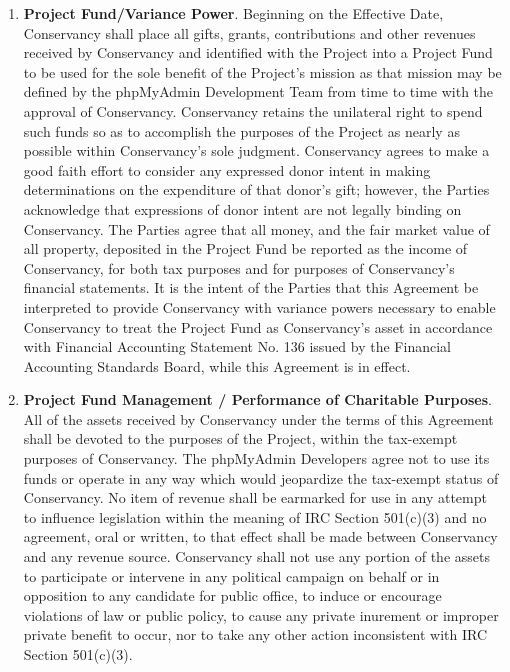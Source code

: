 \documentclass[letterpaper,12pt]{article}
\newcommand{\signatories}{phpMyAdmin Developers\xspace}
\newcommand{\leadershipbody}{phpMyAdmin Development Team\xspace}
\begin{document}
\begin{enumerate}[label=\arabic*.,ref=\S~\arabic*]
Notwithstanding the above, the \signatories agree that should Conservancy
be required to pay any taxes (including but not limited to sales taxes
and unrelated business taxable income) as the result of any activity
of the Project and/or activities undertaken by Conservancy on the
Project's behalf, such taxes shall be deducted from the Project Fund.


Conservancy will monitor any unrelated business taxable income and
may require the Project to cease activities generating such income
if the overall amounts exceed amounts permissible or prudent for Conservancy,
given Conservancy's tax exempt status.

\item \textbf{Project Fund/Variance Power}. Beginning on the Effective Date,
Conservancy shall place all gifts, grants, contributions and other
revenues received by Conservancy and identified with the Project into
a Project Fund to be used for the sole benefit of the Project's mission
as that mission may be defined by the \leadershipbody from
time to time with the approval of Conservancy. Conservancy retains
the unilateral right to spend such funds so as to accomplish the purposes
of the Project as nearly as possible within Conservancy's sole judgment.
Conservancy agrees to make a good faith effort to consider any expressed
donor intent in making determinations on the expenditure of that donor's
gift; however, the Parties acknowledge that expressions of donor intent
are not legally binding on Conservancy. The Parties agree that all
money, and the fair market value of all property, deposited in the
Project Fund be reported as the income of Conservancy, for both tax
purposes and for purposes of Conservancy's financial statements. It
is the intent of the Parties that this Agreement be interpreted to
provide Conservancy with variance powers necessary to enable Conservancy
to treat the Project Fund as Conservancy's asset in accordance with
Financial Accounting Statement No. 136 issued by the Financial Accounting
Standards Board, while this Agreement is in effect. 
\item \textbf{Project Fund Management / Performance of Charitable Purposes}.
\label{CharitablePurpose} All of the assets received by Conservancy
under the terms of this Agreement shall be devoted to the purposes
of the Project, within the tax-exempt purposes of Conservancy. The
\signatories agree not to use its funds or operate in any way which would
jeopardize the tax-exempt status of Conservancy. No item of revenue
shall be earmarked for use in any attempt to influence legislation
within the meaning of IRC Section 501(c)(3) and no agreement, oral
or written, to that effect shall be made between Conservancy and any
revenue source. Conservancy shall not use any portion of the assets
to participate or intervene in any political campaign on behalf or
in opposition to any candidate for public office, to induce or encourage
violations of law or public policy, to cause any private inurement
or improper private benefit to occur, nor to take any other action
inconsistent with IRC Section 501(c)(3). 


\end{enumerate}
\end{document}
